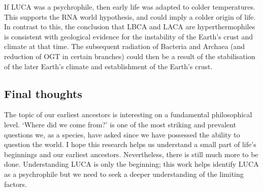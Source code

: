 If LUCA was a psychrophile, then early life was adapted to colder temperatures. This supports the RNA world hypothesis, and could imply a colder origin of life. In contrast to this, the conclusion that LBCA and LACA are hyperthermophiles is consistent with geological evidence for the instability of the Earth's crust and climate at that time. The subsequent radiation of Bacteria and Archaea (and reduction of OGT in certain branches) could then be a result of the stabilisation of the later Earth's climate and establishment of the Earth's crust. 

\subsection{Final thoughts}

The topic of our earliest ancestors is interesting on a fundamental philosophical level. `Where did we come from?' is one of the most striking and prevalent questions we, as a species, have asked since we have possessed the ability to question the world. I hope this research helps us understand a small part of life's beginnings and our earliest ancestors. Nevertheless, there is still much more to be done.  Understanding LUCA is only the beginning; this work helps identify LUCA as a psychrophile but we need to seek a deeper understanding of the limiting factors.


 

